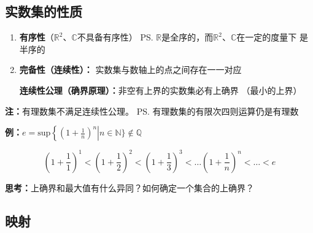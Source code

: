 \subsection{实数集的性质}
	\begin{enumerate} 
	  \item {\bf 有序性}（$\mathbb{R}^2$、$\mathbb{C}$不具备有序性） 
	  \ps{$\mathbb{R}$是全序的，而$\mathbb{R}^2$、$\mathbb{C}$在一定的度量下
	  是半序的}
	  \item {\bf 完备性（连续性）： }实数集与数轴上的点之间存在一一对应
	  
	  {\bf{连续性公理（确界原理）：}}非空有{上界}的实数集必有{上确界} （最小的上界）
	\end{enumerate}
	
	{\bf 注：}有理数集不满足连续性公理。
	\ps{有理数集的有限次四则运算仍是有理数}
	
	{\bf 例：$e=\mathrm{sup}\left\{\left(1+\frac
	1n\right)^n\right|n\in\mathbb{N}\}\notin\mathbb{Q}$}
	\begin{center}
	\end{center}
	$$\left(1+\frac11\right)^1<\left(1+\frac12\right)^2<\left(1+\frac13\right)^3<\ldots
	\left(1+\frac1n\right)^n<\ldots<e$$
	
	{\bf 思考：}上确界和最大值有什么异同？如何确定一个集合的上确界？

\subsection{映射}

